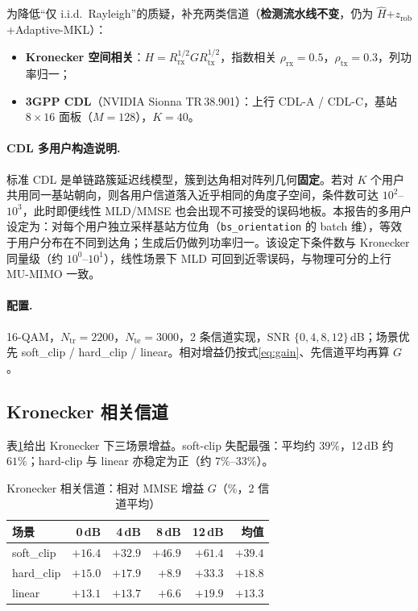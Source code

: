 为降低“仅 i.i.d.\ Rayleigh”的质疑，补充两类信道（\textbf{检测流水线不变}，仍为 $\hat H$+$z_{\mathrm{rob}}$+Adaptive-MKL）：
\begin{itemize}[leftmargin=2em]
  \item \textbf{Kronecker 空间相关}：$H=R_{\mathrm{rx}}^{1/2}GR_{\mathrm{tx}}^{1/2}$，指数相关 $\rho_{\mathrm{rx}}=0.5$，$\rho_{\mathrm{tx}}=0.3$，列功率归一；
  \item \textbf{3GPP CDL}（NVIDIA Sionna TR\,38.901）：上行 CDL-A / CDL-C，基站 $8\times16$ 面板（$M=128$），$K=40$。
\end{itemize}

\paragraph{CDL 多用户构造说明.}
标准 CDL 是单链路簇延迟线模型，簇到达角相对阵列几何\textbf{固定}。若对 $K$ 个用户共用同一基站朝向，则各用户信道落入近乎相同的角度子空间，条件数可达 $10^2$--$10^3$，此时即便线性 MLD/MMSE 也会出现不可接受的误码地板。本报告的多用户设定为：对每个用户独立采样基站方位角（\texttt{bs\_orientation} 的 batch 维），等效于用户分布在不同到达角；生成后仍做列功率归一。该设定下条件数与 Kronecker 同量级（约 $10^0$--$10^1$），线性场景下 MLD 可回到近零误码，与物理可分的上行 MU-MIMO 一致。

\paragraph{配置.}
16-QAM，$N_{\mathrm{tr}}=2200$，$N_{\mathrm{te}}=3000$，2 条信道实现，SNR $\{0,4,8,12\}$\,dB；场景优先 soft\_clip / hard\_clip / linear。相对增益仍按式\eqref{eq:gain}、先信道平均再算 $G$。

\subsection{Kronecker 相关信道}

表\ref{tab:kron-gain}给出 Kronecker 下三场景增益。soft-clip 失配最强：平均约 $39\%$，12\,dB 约 $61\%$；hard-clip 与 linear 亦稳定为正（约 $7\%$--$33\%$）。

\begin{table}[H]
\centering
\caption{Kronecker 相关信道：相对 MMSE 增益 $G$（\%，2 信道平均）}
\label{tab:kron-gain}
\begin{tabular}{lrrrrr}
\toprule
场景 & 0\,dB & 4\,dB & 8\,dB & 12\,dB & 均值 \\
\midrule
soft\_clip & $+16.4$ & $+32.9$ & $+46.9$ & $+61.4$ & $+39.4$ \\
hard\_clip & $+15.0$ & $+17.9$ & $+8.9$  & $+33.3$ & $+18.8$ \\
linear     & $+13.1$ & $+13.7$ & $+6.6$  & $+19.9$ & $+13.3$ \\
\bottomrule
\end{tabular}
\end{table}

